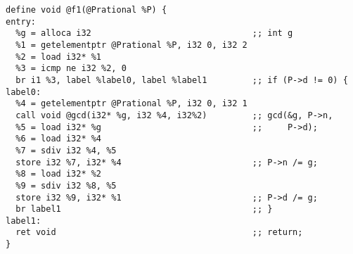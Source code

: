 \documentclass[10pt,a4paper]{article}
\begin{document}
\begin{verbatim}
define void @f1(@Prational %P) {
entry:
  %g = alloca i32                                ;; int g
  %1 = getelementptr @Prational %P, i32 0, i32 2
  %2 = load i32* %1
  %3 = icmp ne i32 %2, 0
  br i1 %3, label %label0, label %label1         ;; if (P->d != 0) {
label0:
  %4 = getelementptr @Prational %P, i32 0, i32 1
  call void @gcd(i32* %g, i32 %4, i32%2)         ;; gcd(&g, P->n,
  %5 = load i32* %g                              ;;     P->d);
  %6 = load i32* %4
  %7 = sdiv i32 %4, %5
  store i32 %7, i32* %4                          ;; P->n /= g;
  %8 = load i32* %2
  %9 = sdiv i32 %8, %5
  store i32 %9, i32* %1                          ;; P->d /= g;
  br label1                                      ;; }
label1:
  ret void                                       ;; return;
}
\end{verbatim}
\end{document}
